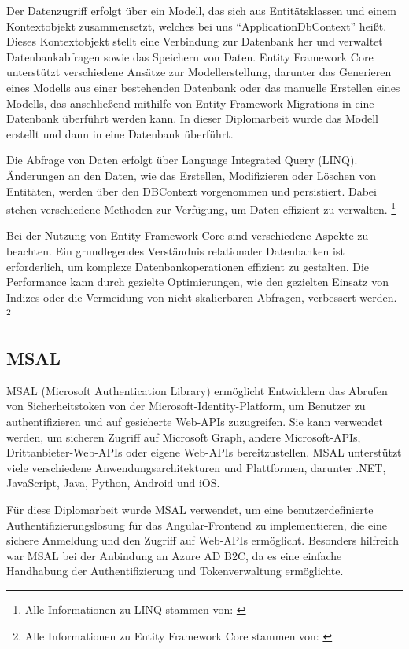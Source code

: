 Der Datenzugriff erfolgt über ein Modell, das sich aus Entitätsklassen und einem 
Kontextobjekt zusammensetzt, welches bei uns ``ApplicationDbContext'' heißt. Dieses Kontextobjekt 
stellt eine Verbindung zur Datenbank her und verwaltet Datenbankabfragen sowie das Speichern 
von Daten. Entity Framework Core unterstützt verschiedene Ansätze zur Modellerstellung, 
darunter das Generieren eines Modells aus einer bestehenden Datenbank oder das manuelle 
Erstellen eines Modells, das anschließend mithilfe von Entity Framework Migrations in 
eine Datenbank überführt werden kann. In dieser Diplomarbeit wurde das Modell erstellt und dann
in eine Datenbank überführt.

Die Abfrage von Daten erfolgt über Language Integrated Query (LINQ). Änderungen an den Daten, 
wie das Erstellen, Modifizieren oder Löschen von Entitäten, werden über den DBContext 
vorgenommen und persistiert. Dabei stehen verschiedene Methoden zur Verfügung, 
um Daten effizient zu verwalten.
\footnote{Alle Informationen zu LINQ stammen von: \cite{MicrosoftCorporationq}}

Bei der Nutzung von Entity Framework Core sind verschiedene Aspekte zu beachten. Ein 
grundlegendes Verständnis relationaler Datenbanken ist erforderlich, um komplexe 
Datenbankoperationen effizient zu gestalten. Die Performance kann durch gezielte 
Optimierungen, wie den gezielten Einsatz von Indizes oder die Vermeidung von nicht 
skalierbaren Abfragen, verbessert werden.
\footnote{Alle Informationen zu Entity Framework Core stammen von: \cite{MicrosoftCorporationp}}


\subsection{MSAL}

MSAL (Microsoft Authentication Library) ermöglicht Entwicklern das Abrufen von Sicherheitstoken 
von der Microsoft-Identity-Platform, um Benutzer zu authentifizieren und auf gesicherte Web-APIs 
zuzugreifen. Sie kann verwendet werden, um sicheren Zugriff auf Microsoft Graph, andere 
Microsoft-APIs, Drittanbieter-Web-APIs oder eigene Web-APIs bereitzustellen. MSAL unterstützt 
viele verschiedene Anwendungsarchitekturen und Plattformen, darunter .NET, JavaScript, Java, 
Python, Android und iOS.

Für diese Diplomarbeit wurde MSAL verwendet, um eine benutzerdefinierte Authentifizierungslösung 
für das Angular-Frontend zu implementieren, die eine sichere Anmeldung und den Zugriff auf 
Web-APIs ermöglicht. Besonders hilfreich war MSAL bei der Anbindung an Azure AD B2C, da es 
eine einfache Handhabung der Authentifizierung und Tokenverwaltung ermöglichte.

